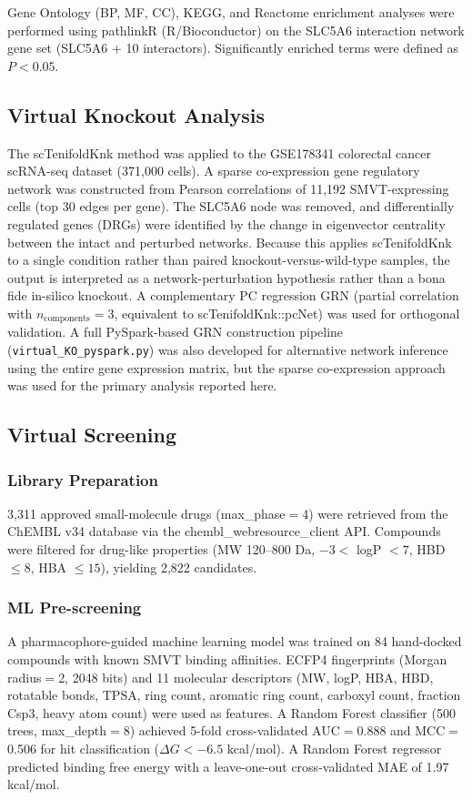 \documentclass[10pt,letterpaper]{article}
\begin{document}
Gene Ontology (BP, MF, CC), KEGG, and Reactome enrichment analyses were performed using pathlinkR (R/Bioconductor) on the SLC5A6 interaction network gene set (SLC5A6 + 10 interactors). Significantly enriched terms were defined as $P < 0.05$.

\subsection*{Virtual Knockout Analysis}

The scTenifoldKnk method was applied to the GSE178341 colorectal cancer scRNA-seq dataset (371,000 cells). A sparse co-expression gene regulatory network was constructed from Pearson correlations of 11,192 SMVT-expressing cells (top 30 edges per gene). The SLC5A6 node was removed, and differentially regulated genes (DRGs) were identified by the change in eigenvector centrality between the intact and perturbed networks. Because this applies scTenifoldKnk to a single condition rather than paired knockout-versus-wild-type samples, the output is interpreted as a network-perturbation hypothesis rather than a bona fide in-silico knockout. A complementary PC regression GRN (partial correlation with $n_{\text{components}}=3$, equivalent to scTenifoldKnk::pcNet) was used for orthogonal validation. A full PySpark-based GRN construction pipeline (\texttt{virtual\_KO\_pyspark.py}) was also developed for alternative network inference using the entire gene expression matrix, but the sparse co-expression approach was used for the primary analysis reported here.

\subsection*{Virtual Screening}

\subsubsection*{Library Preparation}
3,311 approved small-molecule drugs (max\_phase$=$4) were retrieved from the ChEMBL v34 database via the chembl\_webresource\_client API. Compounds were filtered for drug-like properties (MW 120--800 Da, $-3 <$ logP $< 7$, HBD $\leq 8$, HBA $\leq 15$), yielding 2,822 candidates.

\subsubsection*{ML Pre-screening}
A pharmacophore-guided machine learning model was trained on 84 hand-docked compounds with known SMVT binding affinities. ECFP4 fingerprints (Morgan radius$=$2, 2048 bits) and 11 molecular descriptors (MW, logP, HBA, HBD, rotatable bonds, TPSA, ring count, aromatic ring count, carboxyl count, fraction Csp3, heavy atom count) were used as features. A Random Forest classifier (500 trees, max\_depth$=$8) achieved 5-fold cross-validated AUC$=$0.888 and MCC$=$0.506 for hit classification ($\Delta G < -6.5$ kcal/mol). A Random Forest regressor predicted binding free energy with a leave-one-out cross-validated MAE of 1.97 kcal/mol.
\end{document}
